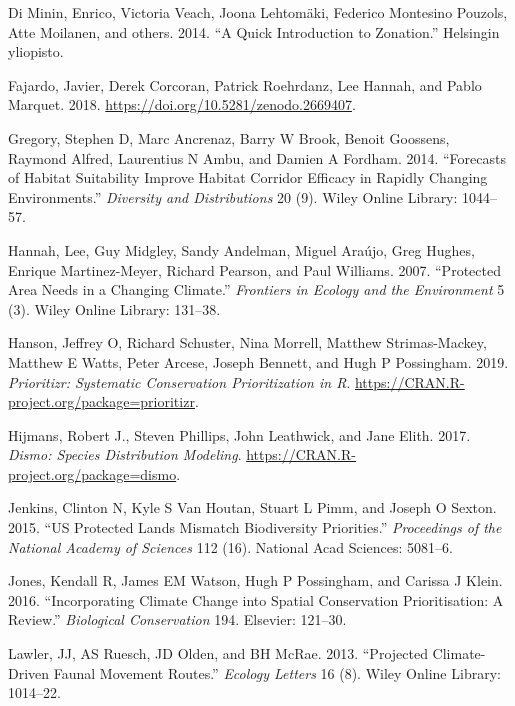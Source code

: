 \documentclass[]{article}
\begin{document}
\leavevmode\hypertarget{ref-di2014quick}{}%
Di Minin, Enrico, Victoria Veach, Joona Lehtomäki, Federico Montesino Pouzols, Atte Moilanen, and others. 2014. ``A Quick Introduction to Zonation.'' Helsingin yliopisto.

\leavevmode\hypertarget{ref-fajardo_javier_2018_2669407}{}%
Fajardo, Javier, Derek Corcoran, Patrick Roehrdanz, Lee Hannah, and Pablo Marquet. 2018. \url{https://doi.org/10.5281/zenodo.2669407}.

\leavevmode\hypertarget{ref-gregory2014forecasts}{}%
Gregory, Stephen D, Marc Ancrenaz, Barry W Brook, Benoit Goossens, Raymond Alfred, Laurentius N Ambu, and Damien A Fordham. 2014. ``Forecasts of Habitat Suitability Improve Habitat Corridor Efficacy in Rapidly Changing Environments.'' \emph{Diversity and Distributions} 20 (9). Wiley Online Library: 1044--57.

\leavevmode\hypertarget{ref-hannah2007protected}{}%
Hannah, Lee, Guy Midgley, Sandy Andelman, Miguel Araújo, Greg Hughes, Enrique Martinez-Meyer, Richard Pearson, and Paul Williams. 2007. ``Protected Area Needs in a Changing Climate.'' \emph{Frontiers in Ecology and the Environment} 5 (3). Wiley Online Library: 131--38.

\leavevmode\hypertarget{ref-Hanson2019}{}%
Hanson, Jeffrey O, Richard Schuster, Nina Morrell, Matthew Strimas-Mackey, Matthew E Watts, Peter Arcese, Joseph Bennett, and Hugh P Possingham. 2019. \emph{Prioritizr: Systematic Conservation Prioritization in R}. \url{https://CRAN.R-project.org/package=prioritizr}.

\leavevmode\hypertarget{ref-Hijmans_Dismo}{}%
Hijmans, Robert J., Steven Phillips, John Leathwick, and Jane Elith. 2017. \emph{Dismo: Species Distribution Modeling}. \url{https://CRAN.R-project.org/package=dismo}.

\leavevmode\hypertarget{ref-jenkins2015us}{}%
Jenkins, Clinton N, Kyle S Van Houtan, Stuart L Pimm, and Joseph O Sexton. 2015. ``US Protected Lands Mismatch Biodiversity Priorities.'' \emph{Proceedings of the National Academy of Sciences} 112 (16). National Acad Sciences: 5081--6.

\leavevmode\hypertarget{ref-jones2016incorporating}{}%
Jones, Kendall R, James EM Watson, Hugh P Possingham, and Carissa J Klein. 2016. ``Incorporating Climate Change into Spatial Conservation Prioritisation: A Review.'' \emph{Biological Conservation} 194. Elsevier: 121--30.

\leavevmode\hypertarget{ref-lawler2013projected}{}%
Lawler, JJ, AS Ruesch, JD Olden, and BH McRae. 2013. ``Projected Climate-Driven Faunal Movement Routes.'' \emph{Ecology Letters} 16 (8). Wiley Online Library: 1014--22.
\end{document}
